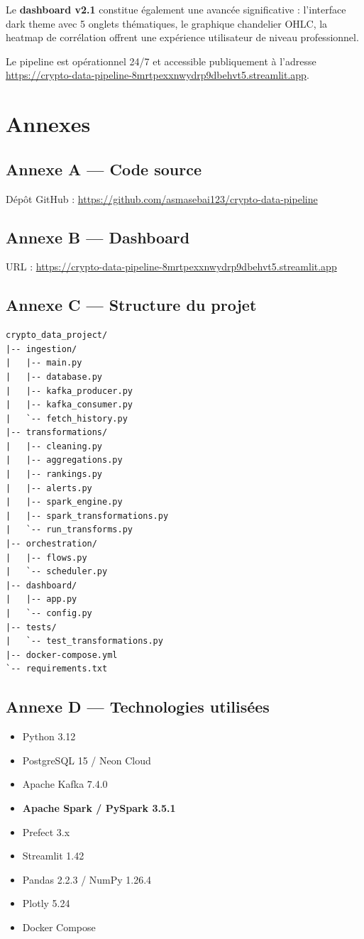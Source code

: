 \documentclass[12pt,a4paper]{article}
\begin{document}
Le \textbf{dashboard v2.1} constitue également une avancée significative : l'interface dark theme avec 5 onglets thématiques, le graphique chandelier OHLC, la heatmap de corrélation offrent une expérience utilisateur de niveau professionnel.

Le pipeline est opérationnel 24/7 et accessible publiquement à l'adresse \\
\url{https://crypto-data-pipeline-8mrtpexxnwydrp9dbehvt5.streamlit.app}.

\section*{Annexes}

\subsection*{Annexe A --- Code source}
Dépôt GitHub : \url{https://github.com/asmasebai123/crypto-data-pipeline}

\subsection*{Annexe B --- Dashboard}
URL : \url{https://crypto-data-pipeline-8mrtpexxnwydrp9dbehvt5.streamlit.app}

\subsection*{Annexe C --- Structure du projet}
\begin{lstlisting}
crypto_data_project/
|-- ingestion/
|   |-- main.py
|   |-- database.py
|   |-- kafka_producer.py
|   |-- kafka_consumer.py
|   `-- fetch_history.py
|-- transformations/
|   |-- cleaning.py
|   |-- aggregations.py
|   |-- rankings.py
|   |-- alerts.py
|   |-- spark_engine.py
|   |-- spark_transformations.py
|   `-- run_transforms.py
|-- orchestration/
|   |-- flows.py
|   `-- scheduler.py
|-- dashboard/
|   |-- app.py
|   `-- config.py
|-- tests/
|   `-- test_transformations.py
|-- docker-compose.yml
`-- requirements.txt
\end{lstlisting}

\subsection*{Annexe D --- Technologies utilisées}
\begin{itemize}[noitemsep]
    \item Python 3.12
    \item PostgreSQL 15 / Neon Cloud
    \item Apache Kafka 7.4.0
    \item \textbf{Apache Spark / PySpark 3.5.1}
    \item Prefect 3.x
    \item Streamlit 1.42
    \item Pandas 2.2.3 / NumPy 1.26.4
    \item Plotly 5.24
    \item Docker Compose
\end{itemize}
\end{document}
